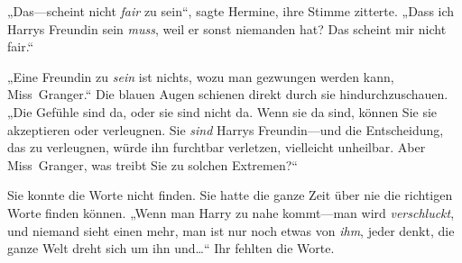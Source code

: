 „Das—scheint nicht \emph{fair} zu sein“, sagte Hermine, ihre Stimme zitterte. „Dass ich Harrys Freundin sein \emph{muss}, weil er sonst niemanden hat? Das scheint mir nicht fair.“

„Eine Freundin zu \emph{sein} ist nichts, wozu man gezwungen werden kann, Miss~Granger.“ Die blauen Augen schienen direkt durch sie hindurchzuschauen. „Die Gefühle sind da, oder sie sind nicht da. Wenn sie da sind, können Sie sie akzeptieren oder verleugnen. Sie \emph{sind} Harrys Freundin—und die Entscheidung, das zu verleugnen, würde ihn furchtbar verletzen, vielleicht unheilbar. Aber Miss~Granger, was treibt Sie zu solchen Extremen?“

Sie konnte die Worte nicht finden. Sie hatte die ganze Zeit über nie die richtigen Worte finden können. „Wenn man Harry zu nahe kommt—man wird \emph{verschluckt}, und niemand sieht einen mehr, man ist nur noch etwas von \emph{ihm}, jeder denkt, die ganze Welt dreht sich um ihn und…“ Ihr fehlten die Worte.

